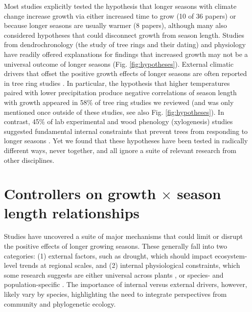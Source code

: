 \documentclass[11pt]{article}
\begin{document}
Most studies explicitly tested the hypothesis that longer seasons with climate change increase growth via either increased time to grow (10 of 36 papers) or because longer seasons are usually warmer (8 papers), although many also considered hypotheses that could disconnect growth from season length. Studies from dendrochronology (the study of tree rings and their dating) and physiology have readily offered explanations for findings that increased growth may not be a universal outcome of longer seasons (Fig. \ref{fig:hypotheses}). External climatic drivers that offset the positive growth effects of longer seasons are often reported in tree ring studies \citep{kolavr2016response,de2022temperature,camarero2022decoupled}. In particular, the hypothesis that higher temperatures paired with lower precipitation produce negative correlations of season length with growth appeared in 58\% of tree ring studies we reviewed (and was only mentioned once outside of these studies, see also Fig. \ref{fig:hypotheses}). In contrast, 45\% of lab experimental and wood phenology (xylogenesis) studies suggested fundamental internal constraints that prevent trees from responding to longer seasons \citep[Fig. \ref{fig:heatmapssupp},][]{cuny2012life,michelot2012comparing,zohner2023effect}. Yet we found that these hypotheses have been tested in radically different ways, never together, and all ignore a suite of relevant research from other disciplines. %
 
\section*{Controllers on growth $\times$ season length relationships}

Studies have uncovered a suite of major mechanisms that could limit or disrupt the positive effects of longer growing seasons. These generally fall into two categories: (1) external factors, such as drought, which should impact ecosystem-level trends at regional scales, and (2) internal physiological constraints, which some research suggests are either universal across plants \citep[e.g.][]{zohner2023effect}, or species- and population-specific \citep[e.g.][]{soolanayakanahally2013timing}. The importance of internal versus external drivers, however, likely vary by species, highlighting the need to integrate perspectives from community and phylogenetic ecology. 
\end{document}
